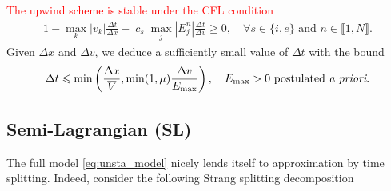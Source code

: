 \documentclass{article}
\numberwithin{equation}{section}
\newcommand{\todo}[1]{{\color{red}\textbf{#1}}}
\begin{document}
\noindent \textcolor{red}{The upwind scheme is stable under the CFL condition} %
\begin{align*}
	1 - \max_{k} |v_k| \frac{\Delta t}{\Delta x} - |c_s| \max_{j} |E^n_j| \frac{\Delta t}{\Delta v} \geqslant 0, \quad \forall s \in \{i,e\}\text{ and } n \in \llbracket1,N\rrbracket.
\end{align*}
Given $\Delta x$ and $\Delta v$, we deduce a sufficiently small value of $\Delta t$ with the bound
\begin{align}
	\Delta t \leqslant \min\left(\frac{\Delta x}{\overline{V}}, \min(1,\mu)\frac{\Delta v}{E_{\text{max}}}\right), \quad E_{\text{max}}>0 \text{ postulated \emph{a priori}.}
	\label{eq:CFL}
\end{align}

\subsection{Semi-Lagrangian (SL)}\label{ssec:SLscheme}

The full model \cref{eq:unsta_model} nicely lends itself to approximation by time splitting. Indeed, consider the following Strang splitting decomposition 


%
%
\end{document}
